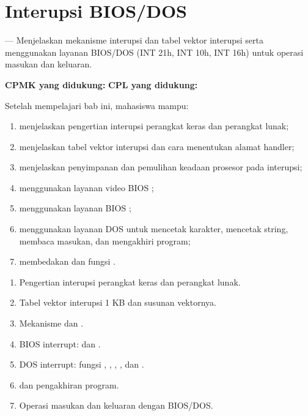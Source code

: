 \documentclass[../../main.tex]{subfiles}
\begin{document}
\chapter{Interupsi BIOS/DOS}
\label{chap:interupsi}


\begin{subcpmkbox}
\vspace{1.1em}
 --- Menjelaskan mekanisme interupsi dan tabel vektor
interupsi serta menggunakan layanan BIOS/DOS (INT 21h, INT 10h,
INT 16h) untuk operasi masukan dan keluaran.

\vspace{0.4em}
\textbf{CPMK yang didukung:}  \quad\textbullet\quad
\textbf{CPL yang didukung:} 
\end{subcpmkbox}

\begin{tujuanbox}
\vspace{1.1em}
Setelah mempelajari bab ini, mahasiswa mampu:
\begin{enumerate}
    \item menjelaskan pengertian interupsi perangkat keras dan
          perangkat lunak;
    \item menjelaskan tabel vektor interupsi dan cara menentukan
          alamat handler;
    \item menjelaskan penyimpanan dan pemulihan keadaan prosesor
          pada interupsi;
    \item menggunakan layanan video BIOS ;
    \item menggunakan layanan  BIOS ;
    \item menggunakan layanan DOS  untuk mencetak
          karakter, mencetak string, membaca masukan, dan mengakhiri
          program;
    \item membedakan  dan  fungsi
          .
\end{enumerate}
\end{tujuanbox}

\begin{materibox}
\vspace{1.1em}
\begin{enumerate}
    \item Pengertian interupsi perangkat keras dan perangkat lunak.
    \item Tabel vektor interupsi 1 KB dan susunan vektornya.
    \item Mekanisme  dan .
    \item BIOS interrupt:  dan .
    \item DOS interrupt:  fungsi , ,
          , , dan .
    \item {} dan pengakhiran program.
    \item Operasi masukan dan keluaran dengan BIOS/DOS.
\end{enumerate}
\end{materibox}










\end{document}
